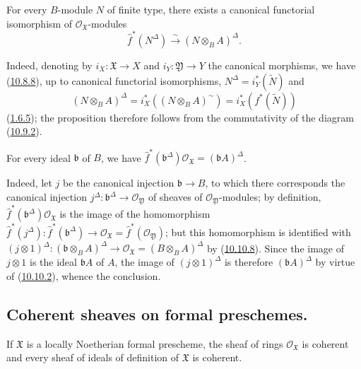 \begin{proposition}[10.10.8]
\label{I.10.10.8}
For every $B$-module $N$ of finite type, there exists a canonical
functorial isomorphism of $\mathscr{O}_{\mathfrak{X}}$-modules
\[
  \widehat f^*(N^\Delta)
  \xrightarrow{\sim}
  (N\otimes_B A)^\Delta.
\]
\end{proposition}

Indeed, denoting by $i_X:\mathfrak{X}\to X$ and
$i_Y:\mathfrak{Y}\to Y$ the canonical morphisms, we have
(\hyperref[I.10.8.8]{10.8.8}), up to canonical functorial
isomorphisms, $N^\Delta=i_Y^*(\widetilde N)$ and
\[
  (N\otimes_B A)^\Delta
  =i_X^*((N\otimes_B A)^{\sim})
  =i_X^*(f^*(\widetilde N))
\]
(\hyperref[I.1.6.5]{1.6.5}); the proposition therefore follows from
the commutativity of the diagram (\hyperref[I.10.9.2]{10.9.2}).

\begin{corollary}[10.10.9]
\label{I.10.10.9}
For every ideal $\mathfrak b$ of $B$, we have
$\widehat f^*(\mathfrak b^\Delta)\mathscr{O}_{\mathfrak{X}}
=(\mathfrak bA)^\Delta$.
\end{corollary}

Indeed, let $j$ be the canonical injection $\mathfrak b\to B$, to which
there corresponds the canonical injection
$j^\Delta:\mathfrak b^\Delta\to\mathscr{O}_{\mathfrak{Y}}$ of
sheaves of $\mathscr{O}_{\mathfrak{Y}}$-modules; by definition,
$\widehat f^*(\mathfrak b^\Delta)\mathscr{O}_{\mathfrak{X}}$ is
the image of the homomorphism
$\widehat f^*(j^\Delta):\widehat f^*(\mathfrak b^\Delta)\to
\mathscr{O}_{\mathfrak{X}}=\widehat f^*(\mathscr{O}_{\mathfrak{Y}})$;
but this homomorphism is identified with
$(j\otimes1)^\Delta:(\mathfrak b\otimes_B A)^\Delta\to
\mathscr{O}_{\mathfrak{X}}=(B\otimes_B A)^\Delta$ by
(\hyperref[I.10.10.8]{10.10.8}). Since the image of $j\otimes1$ is
the ideal $\mathfrak bA$ of $A$, the image of $(j\otimes1)^\Delta$ is
therefore $(\mathfrak bA)^\Delta$ by virtue of
(\hyperref[I.10.10.2]{10.10.2}), whence the conclusion.


\subsection{Coherent sheaves on formal preschemes.}
\label{subsection:I.10.11}

\begin{proposition}[10.11.1]
\label{I.10.11.1}
If $\mathfrak{X}$ is a locally Noetherian formal prescheme, the
sheaf of rings $\mathscr{O}_{\mathfrak{X}}$ is coherent and every
sheaf of ideals of definition of $\mathfrak{X}$ is coherent.
\end{proposition}

